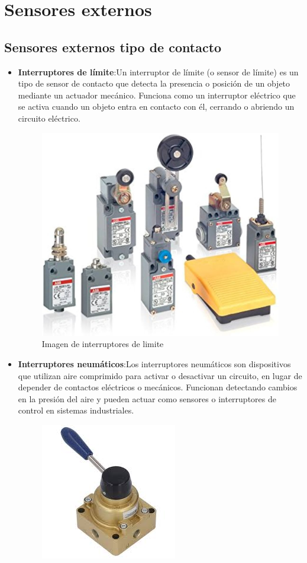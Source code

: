 \section{Sensores externos}
\subsection{Sensores externos tipo de contacto}

\begin{itemize}
	\item \textbf{Interruptores de límite}:Un interruptor de límite (o sensor de límite) es un tipo de sensor de contacto que detecta la presencia o posición de un objeto mediante un actuador mecánico. Funciona como un interruptor eléctrico que se activa cuando un objeto entra en contacto con él, cerrando o abriendo un circuito eléctrico.
	\begin{figure}[h]
		\centering
		\includegraphics[width=6 cm]{img/ilim}
		\caption{Imagen de interruptores de limite}
		\label{fig:ilim}
	\end{figure}
	\item \textbf{Interruptores neumáticos}:Los interruptores neumáticos son dispositivos que utilizan aire comprimido para activar o desactivar un circuito, en lugar de depender de contactos eléctricos o mecánicos. Funcionan detectando cambios en la presión del aire y pueden actuar como sensores o interruptores de control en sistemas industriales.
	\begin{figure}[h]
		\centering
		\includegraphics[width=6 cm]{img/inem}

\end{figure}
\end{itemize}
